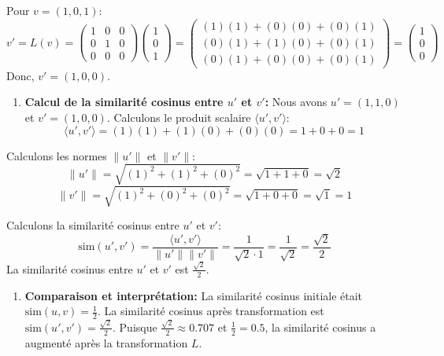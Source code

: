 \documentclass[11pt,a4paper]{report}
\begin{document}
\begin{enumerate}
  Pour \(v = (1, 0, 1)\):
  \[ v' = L(v) = \begin{pmatrix} 1 & 0 & 0 \\ 0 & 1 & 0 \\ 0 & 0 & 0 \end{pmatrix} \begin{pmatrix} 1 \\ 0 \\ 1 \end{pmatrix} = \begin{pmatrix} (1)(1) + (0)(0) + (0)(1) \\ (0)(1) + (1)(0) + (0)(1) \\ (0)(1) + (0)(0) + (0)(1) \end{pmatrix} = \begin{pmatrix} 1 \\ 0 \\ 0 \end{pmatrix} \]
  Donc, \(v' = (1, 0, 0)\).

  \begin{enumerate}
  \def\labelenumii{\alph{enumii}.}
  \setcounter{enumii}{1}

  \item
    \textbf{Calcul de la similarité cosinus entre \(u'\) et \(v'\):}
    Nous avons \(u' = (1, 1, 0)\) et \(v' = (1, 0, 0)\). Calculons le
    produit scalaire \(\langle u', v' \rangle\):
    \[ \langle u', v' \rangle = (1)(1) + (1)(0) + (0)(0) = 1 + 0 + 0 = 1 \]
  \end{enumerate}

  Calculons les normes \(\|u'\|\) et \(\|v'\|\):
  \[ \|u'\| = \sqrt{(1)^2 + (1)^2 + (0)^2} = \sqrt{1 + 1 + 0} = \sqrt{2} \]
  \[ \|v'\| = \sqrt{(1)^2 + (0)^2 + (0)^2} = \sqrt{1 + 0 + 0} = \sqrt{1} = 1 \]

  Calculons la similarité cosinus entre \(u'\) et \(v'\):
  \[ \text{sim}(u', v') = \frac{\langle u', v' \rangle}{\|u'\| \|v'\|} = \frac{1}{\sqrt{2} \cdot 1} = \frac{1}{\sqrt{2}} = \frac{\sqrt{2}}{2} \]
  La similarité cosinus entre \(u'\) et \(v'\) est
  \(\frac{\sqrt{2}}{2}\).

  \begin{enumerate}
  \def\labelenumii{\alph{enumii}.}
  \setcounter{enumii}{2}

  \item
    \textbf{Comparaison et interprétation:} La similarité cosinus
    initiale était \(\text{sim}(u, v) = \frac{1}{2}\). La similarité
    cosinus après transformation est
    \(\text{sim}(u', v') = \frac{\sqrt{2}}{2}\). Puisque
    \(\frac{\sqrt{2}}{2} \approx 0.707\) et \(\frac{1}{2} = 0.5\), la
    similarité cosinus a augmenté après la transformation \(L\).
  \end{enumerate}


\end{enumerate}
\end{document}
